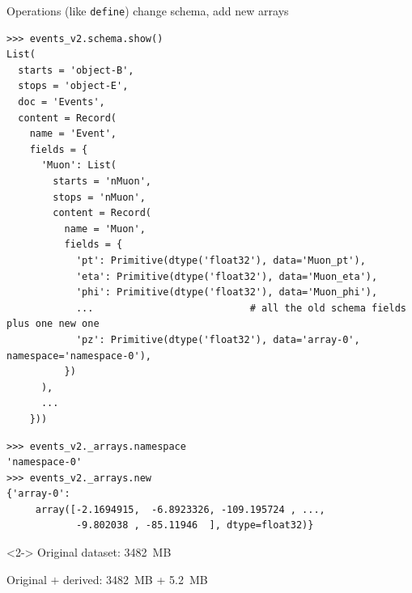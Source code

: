\documentclass[aspectratio=169]{beamer}
\begin{document}
\begin{frame}[fragile]{Operations (like {\tt define}) change schema, add new arrays}
\vspace{0.15 cm}
\scriptsize
\begin{verbatim}
>>> events_v2.schema.show()
List(
  starts = 'object-B',
  stops = 'object-E',
  doc = 'Events',
  content = Record(
    name = 'Event',
    fields = {
      'Muon': List(
        starts = 'nMuon',
        stops = 'nMuon',
        content = Record(
          name = 'Muon',
          fields = {
            'pt': Primitive(dtype('float32'), data='Muon_pt'),
            'eta': Primitive(dtype('float32'), data='Muon_eta'),
            'phi': Primitive(dtype('float32'), data='Muon_phi'),
            ...                           # all the old schema fields plus one new one
            'pz': Primitive(dtype('float32'), data='array-0', namespace='namespace-0'),
          })
      ),
      ...
    }))
\end{verbatim}

\vspace{-7.7 cm}
\hfill \begin{minipage}{0.6\linewidth}
\begin{verbatim}
>>> events_v2._arrays.namespace
'namespace-0'
>>> events_v2._arrays.new
{'array-0':
     array([-2.1694915,  -6.8923326, -109.195724 , ...,
            -9.802038 , -85.11946  ], dtype=float32)}
\end{verbatim}

\begin{uncoverenv}<2->
\normalsize
Original dataset: 3482~MB

\vspace{0.2 cm}
Original $+$ derived: 3482~MB + 5.2~MB
\end{uncoverenv}
\end{minipage}
\vspace{7.7 cm}
\end{frame}
\end{document}

